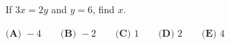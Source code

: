 If \(3x=2y\) and \(y=6\), find \(x\).

\(\textbf{(A) } -4 \qquad\textbf{(B) } -2 \qquad\textbf{(C) } 1 \qquad\textbf{(D) } 2 \qquad\textbf{(E) } 4\)
